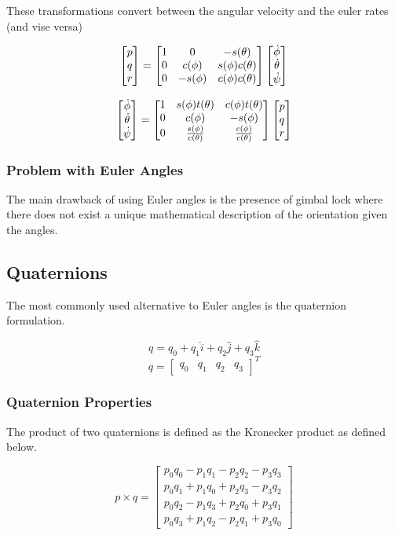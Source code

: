 These transformations convert between the angular velocity and the euler rates (and vise versa)

$$ \begin{bmatrix} p \\ q \\ r \end{bmatrix} = \begin{bmatrix}
    1 & 0 & -s(\theta)\\
    0 & c(\phi) & s(\phi)c(\theta)\\
    0 & -s(\phi) & c(\phi)c(\theta) \end{bmatrix}  \begin{bmatrix} \dot{\phi} \\ \dot{\theta} \\ \dot{\psi} \end{bmatrix}$$

$$ \begin{bmatrix} \dot{\phi} \\ \dot{\theta} \\ \dot{\psi} \end{bmatrix} = \begin{bmatrix}
    1 & s(\phi)t(\theta) & c(\phi)t(\theta)\\
    0 & c(\phi) & -s(\phi)\\
    0 & \frac{s(\phi)}{c(\theta)} & \frac{c(\phi)}{c(\theta)} \end{bmatrix} \begin{bmatrix} p \\ q \\ r \end{bmatrix} $$

\subsubsection{Problem with Euler Angles}
The main drawback of using Euler angles is the presence of gimbal lock where there does not exist a unique mathematical description of the orientation given the angles. 

\subsection{Quaternions}
The most commonly used alternative to Euler angles is the quaternion formulation. 

$$ 
q = q_{0} + q_{1}\hat{i} + q_{2}\hat{j} + q_{3}\hat{k} 
$$
$$q = \begin{bmatrix}
    q_0  & q_1 &  q_2 & q_3
\end{bmatrix}^{T}$$

\subsubsection{Quaternion Properties}

The product of two quaternions is defined as the Kronecker product as defined below.

$$p \times q = \begin{bmatrix}
    p_0q_0 - p_1q_1 - p_2q_2 - p_3q_3 \\
    p_0q_1 + p_1q_0 + p_2q_3 - p_3q_2 \\
    p_0q_2 - p_1q_3 + p_2q_0 + p_3q_1 \\
    p_0q_3 + p_1q_2 - p_2q_1 + p_3q_0
\end{bmatrix}$$


